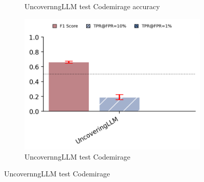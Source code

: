 \begin{figure}[H]
\begin{subfigure}[t]{0.35\textwidth}
        \caption{UncovernngLLM test Codemirage accuracy}
        \label{fig:ab2eresre}
    \end{subfigure}
    \hfill
    \begin{subfigure}[t]{0.5\textwidth}
        \centering
        \includegraphics[width=\linewidth]{img/TEST/UncovernngLLM/72140877550d8b4c252d3271edd3cb9f2891b4de5c29b29a599cb14b.png}
        \caption{UncovernngLLM test Codemirage}
        \label{fig:b2fsefde}
    \end{subfigure}
\end{figure}






